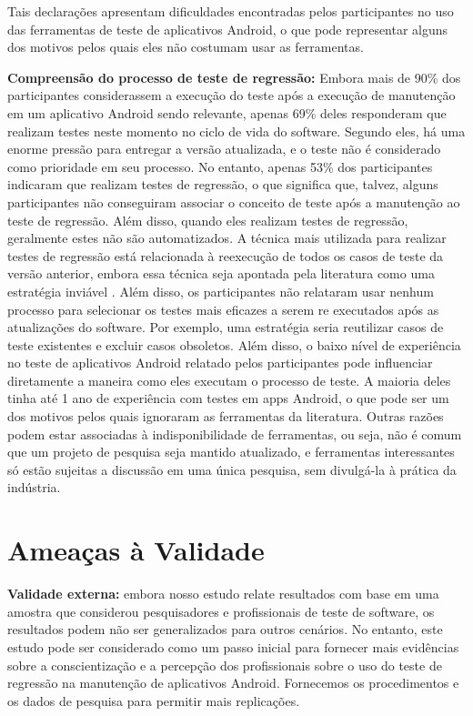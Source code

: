 Tais declarações apresentam dificuldades encontradas pelos participantes no uso das ferramentas de teste de aplicativos Android, o que pode representar alguns dos motivos pelos quais eles não costumam usar as ferramentas. 

\item \textbf{Compreensão do processo de teste de regressão:} Embora mais de 90\% dos participantes considerassem a execução do teste após a execução de manutenção em um aplicativo Android sendo relevante, apenas 69\% deles responderam que realizam testes neste momento no ciclo de vida do software. Segundo eles, há uma enorme pressão para entregar a versão atualizada, e o teste não é considerado como prioridade em seu processo.
No entanto, apenas 53\% dos participantes indicaram que realizam testes de regressão, o que significa que, talvez, alguns participantes não conseguiram associar o conceito de teste após a manutenção ao teste de regressão. Além disso, quando eles realizam testes de regressão, geralmente estes não são automatizados.
A técnica mais utilizada para realizar testes de regressão está relacionada à reexecução de todos os casos de teste da versão anterior, embora essa técnica seja apontada pela literatura como uma estratégia inviável \cite{RothermelGreggHarroldMary2000}. Além disso, os participantes não relataram usar nenhum processo para selecionar os testes mais eficazes a serem re executados após as atualizações do software. Por exemplo, uma estratégia seria reutilizar casos de teste existentes e excluir casos obsoletos.
Além disso, o baixo nível de experiência no teste de aplicativos Android relatado pelos participantes pode influenciar diretamente a maneira como eles executam o processo de teste. A maioria deles tinha até 1 ano de experiência com testes em apps Android, o que pode ser um dos motivos pelos quais ignoraram as ferramentas da literatura. Outras razões podem estar associadas à indisponibilidade de ferramentas, ou seja, não é comum que um projeto de pesquisa seja mantido atualizado, e ferramentas interessantes só estão sujeitas a discussão em uma única pesquisa, sem divulgá-la à prática da indústria.


\section{Ameaças à Validade}\label{threatstovalidity}


\textbf{Validade externa:} embora nosso estudo relate resultados com base em uma amostra que considerou pesquisadores e profissionais de teste de software, os resultados podem não ser generalizados para outros cenários. No entanto, este estudo pode ser considerado como um passo inicial para fornecer mais evidências sobre a conscientização e a percepção dos profissionais sobre o uso do teste de regressão na manutenção de aplicativos Android. Fornecemos os procedimentos e os dados de pesquisa para permitir mais replicações.

